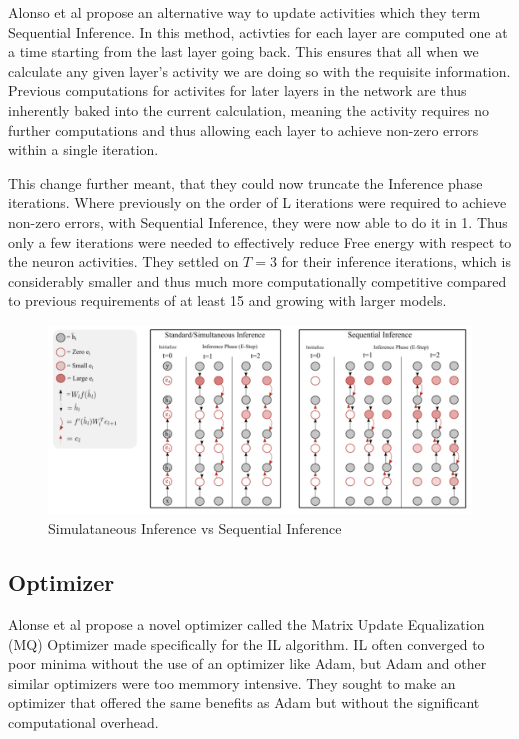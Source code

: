 \documentclass{article}
\theoremstyle{plain}
\theoremstyle{definition}
\theoremstyle{remark}
\begin{document}
Alonso et al propose an alternative way to update activities which they term 
Sequential Inference. In this method, activties for each layer are computed 
one at a time starting from the last layer going back. This ensures that all 
when we calculate any given layer's activity we are doing so with the requisite
information. Previous computations for activites for later layers in the network are
thus inherently baked into the current calculation, meaning the activity requires no further 
computations and thus allowing each layer to achieve non-zero errors within a single iteration.

This change further meant, that they could now truncate the Inference phase iterations.
Where previously on the order of L iterations were required to achieve non-zero errors, 
with Sequential Inference, they were now able to do it in 1. Thus only a few iterations were needed 
to effectively reduce Free energy with respect to the neuron activities. They settled on \(T = 3\)
for their inference iterations, which is considerably smaller and thus much more computationally 
competitive compared to previous requirements of at least 15 and growing with larger models.

\begin{figure}[ht]
    \begin{center}
    \centerline{\includegraphics[width=\columnwidth]{images/seq_il.png}}
    \caption{Simulataneous Inference vs Sequential Inference}
    \end{center}
\end{figure}

\subsection*{Optimizer}

Alonse et al propose a novel optimizer called the Matrix Update Equalization
(MQ) Optimizer made specifically for the IL algorithm. IL often converged to poor
minima without the use of an optimizer like Adam, but Adam and other similar optimizers 
were too memmory intensive. They sought to make an optimizer that offered the same benefits
as Adam but without the significant computational overhead.
\end{document}
